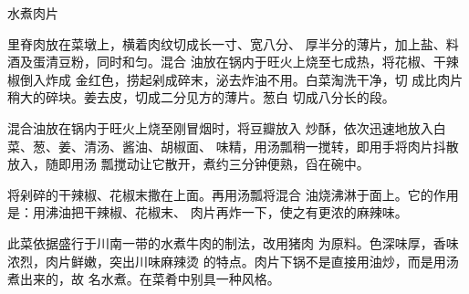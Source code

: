 \begin{recipe}{水煮肉片}

\ingredients


\cooking

\step 里脊肉放在菜墩上，横着肉纹切成长一寸、宽八分、 厚半分的薄片，加上盐、料酒及蛋清豆粉，同时和匀。混合 油放在锅内于旺火上烧至七成热，将花椒、干辣椒倒入炸成 金红色，捞起剁成碎末，泌去炸油不用。白菜淘洗干净，切 成比肉片稍大的碎块。姜去皮，切成二分见方的薄片。葱白 切成八分长的段。

\step 	混合油放在锅内于旺火上烧至刚冒烟时，将豆瓣放入 炒酥，依次迅速地放入白菜、葱、姜、清汤、酱油、胡椒面、 味精，用汤瓢稍一搅转，即用手将肉片抖散放入，随即用汤 瓢搅动让它散开，煮约三分钟便熟，舀在碗中。

\step 	将剁碎的干辣椒、花椒末撒在上面。再用汤瓢将混合 油烧沸淋于面上。它的作用是：用沸油把干辣椒、花椒末、 肉片再炸一下，使之有更浓的麻辣味。

\notes

此菜依据盛行于川南一带的水煮牛肉的制法，改用猪肉 为原料。色深味厚，香味浓烈，肉片鲜嫩，突出川味麻辣烫 的特点。肉片下锅不是直接用油炒，而是用汤煮出来的，故 名水煮。在菜肴中别具一种风格。

\end{recipe}

